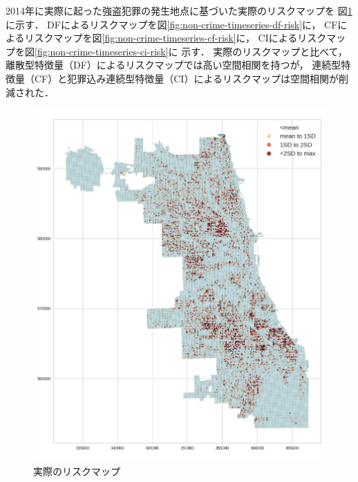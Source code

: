 

2014年に実際に起った強盗犯罪の発生地点に基づいた実際のリスクマップを
図\ref{fig:non-crime-timeseries-actual-risk}に示す．
DFによるリスクマップを図\ref{fig:non-crime-timeseries-df-risk}に，
CFによるリスクマップを図\ref{fig:non-crime-timeseries-cf-risk}に，
CIによるリスクマップを図\ref{fig:non-crime-timeseries-ci-risk}に
示す．
実際のリスクマップと比べて，離散型特徴量（DF）によるリスクマップでは高い空間相関を持つが，
連続型特徴量（CF）と犯罪込み連続型特徴量（CI）によるリスクマップは空間相関が削減された．



\begin{figure}[H]
  \centering %
  \includegraphics[scale=0.15]{./figures/actual_riskmap.png}
  \caption{実際のリスクマップ}
  \label{fig:non-crime-timeseries-actual-risk}
\end{figure}

